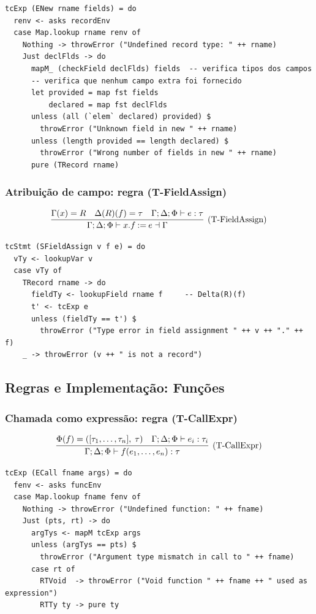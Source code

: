 \begin{verbatim}
tcExp (ENew rname fields) = do
  renv <- asks recordEnv
  case Map.lookup rname renv of
    Nothing -> throwError ("Undefined record type: " ++ rname)
    Just declFlds -> do
      mapM_ (checkField declFlds) fields  -- verifica tipos dos campos
      -- verifica que nenhum campo extra foi fornecido
      let provided = map fst fields
          declared = map fst declFlds
      unless (all (`elem` declared) provided) $
        throwError ("Unknown field in new " ++ rname)
      unless (length provided == length declared) $
        throwError ("Wrong number of fields in new " ++ rname)
      pure (TRecord rname)
\end{verbatim}

\subsubsection{Atribuição de campo: regra (T-FieldAssign)}

\[
  \infer[\text{(T-FieldAssign)}]
  {\Gamma;\Delta;\Phi \vdash x.f \mathbin{:=} e \dashv \Gamma}
  {\Gamma(x) = R \quad \Delta(R)(f) = \tau
  \quad \Gamma;\Delta;\Phi \vdash e : \tau}
\]

\begin{verbatim}
tcStmt (SFieldAssign v f e) = do
  vTy <- lookupVar v
  case vTy of
    TRecord rname -> do
      fieldTy <- lookupField rname f     -- Delta(R)(f)
      t' <- tcExp e
      unless (fieldTy == t') $
        throwError ("Type error in field assignment " ++ v ++ "." ++ f)
    _ -> throwError (v ++ " is not a record")
\end{verbatim}

\subsection{Regras e Implementação: Funções}

\subsubsection{Chamada como expressão: regra (T-CallExpr)}

\[
  \infer[\text{(T-CallExpr)}]
  {\Gamma;\Delta;\Phi \vdash f(e_1,\ldots,e_n) : \tau}
  {\Phi(f) = ([\tau_1,\ldots,\tau_n],\;\tau)
  \quad \Gamma;\Delta;\Phi \vdash e_i : \tau_i}
\]

\begin{verbatim}
tcExp (ECall fname args) = do
  fenv <- asks funcEnv
  case Map.lookup fname fenv of
    Nothing -> throwError ("Undefined function: " ++ fname)
    Just (pts, rt) -> do
      argTys <- mapM tcExp args
      unless (argTys == pts) $
        throwError ("Argument type mismatch in call to " ++ fname)
      case rt of
        RTVoid  -> throwError ("Void function " ++ fname ++ " used as expression")
        RTTy ty -> pure ty
\end{verbatim}

